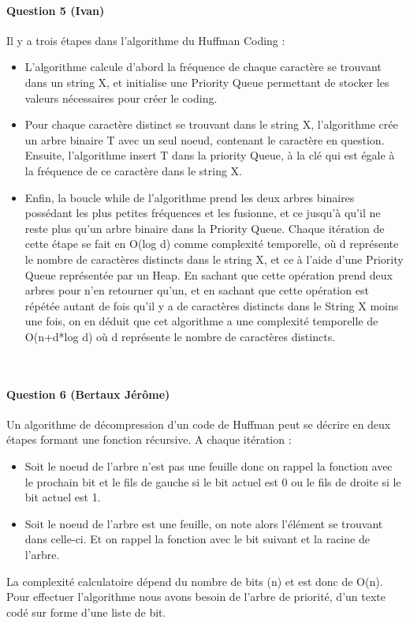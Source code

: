 \documentclass[a4paper]{article}
\begin{document}
\paragraph*{Question 5 (Ivan)}
Il y a trois étapes dans l’algorithme du Huffman Coding : 
\begin{itemize}


\item L’algorithme calcule d’abord la fréquence de chaque caractère se trouvant dans un string X, et initialise une Priority Queue permettant de stocker les valeurs nécessaires pour créer le coding. 
\item Pour chaque caractère distinct se trouvant dans le string X, l’algorithme crée un arbre binaire T avec un seul noeud, contenant le caractère en question. Ensuite, l’algorithme insert T dans la priority Queue, à la clé qui est égale à la fréquence de ce caractère dans le string X. 
\item Enfin, la boucle while de l’algorithme prend les deux arbres binaires possédant les plus petites fréquences et les fusionne, et ce jusqu’à qu’il ne reste plus qu’un arbre binaire dans la Priority Queue. Chaque itération de cette étape se fait en O(log d) comme complexité temporelle, où d représente le nombre de caractères distincts dans le string X, et ce à l’aide d’une Priority Queue représentée par un Heap. En sachant que cette opération prend deux arbres pour n’en retourner qu’un, et en sachant que cette opération est répétée autant de fois qu’il y a de caractères distincts dans le String X moins une fois, on en déduit que cet algorithme a une complexité temporelle de O(n+d*log d) où d représente le nombre de caractères distincts. 
\end{itemize}

\\
\paragraph*{Question 6 (Bertaux Jérôme)}
Un algorithme de décompression d'un code de Huffman peut se décrire en deux étapes formant une fonction récursive. A chaque itération :
\begin{itemize}
\item Soit le noeud de l'arbre n'est pas une feuille donc on rappel la fonction avec le prochain bit et le fils de gauche si le bit actuel est 0 ou le fils de droite si le bit actuel est 1.
\item Soit le noeud de l'arbre est une feuille, on note alors l'élément se trouvant dans celle-ci. Et on rappel la fonction avec le bit suivant et la racine de l'arbre.
\end{itemize} 
La complexité calculatoire dépend du nombre de bits (n) et est donc de O(n). Pour effectuer l'algorithme nous avons besoin de l'arbre de priorité, d'un texte codé sur forme d'une liste de bit.
\end{document}
